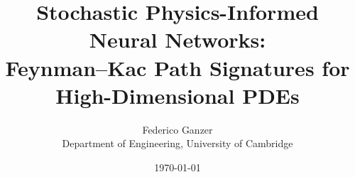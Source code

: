 \documentclass[11pt]{article}
\title{Stochastic Physics-Informed Neural Networks:\\
       Feynman--Kac Path Signatures for High-Dimensional PDEs}
\author{Federico Ganzer\\ \small Department of Engineering, University of Cambridge}
\date{\today}
\begin{document}
\maketitle

\begin{abstract}

\end{abstract}











\end{document}
